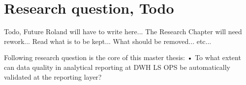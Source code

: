 
\section{Research question, Todo}
Todo, Future Roland will have to write here...
The Research Chapter will need rework...
Read what is to be kept...
What should be removed...
etc...


Following research question is the core of this master thesis:
•	To what extent can data quality in analytical reporting at DWH LS OPS be automatically validated at the reporting layer?
